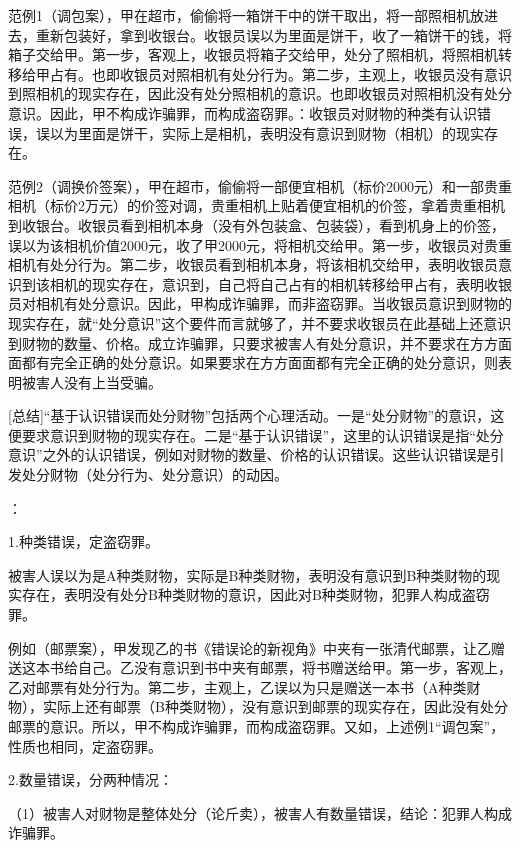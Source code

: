 范例1（调包案），甲在超市，偷偷将一箱饼干中的饼干取出，将一部照相机放进去，重新包装好，拿到收银台。收银员误以为里面是饼干，收了一箱饼干的钱，将箱子交给甲。第一步，客观上，收银员将箱子交给甲，处分了照相机，将照相机转移给甲占有。也即收银员对照相机有处分行为。第二步，主观上，收银员没有意识到照相机的现实存在，因此没有处分照相机的意识。也即收银员对照相机没有处分意识。因此，甲不构成诈骗罪，而构成盗窃罪。：收银员对财物的种类有认识错误，误以为里面是饼干，实际上是相机，表明没有意识到财物（相机）的现实存在。

范例2（调换价签案），甲在超市，偷偷将一部便宜相机（标价2000元）和一部贵重相机（标价2万元）的价签对调，贵重相机上贴着便宜相机的价签，拿着贵重相机到收银台。收银员看到相机本身（没有外包装盒、包装袋），看到机身上的价签，误以为该相机价值2000元，收了甲2000元，将相机交给甲。第一步，收银员对贵重相机有处分行为。第二步，收银员看到相机本身，将该相机交给甲，表明收银员意识到该相机的现实存在，意识到，自己将自己占有的相机转移给甲占有，表明收银员对相机有处分意识。因此，甲构成诈骗罪，而非盗窃罪。当收银员意识到财物的现实存在，就“处分意识”这个要件而言就够了，并不要求收银员在此基础上还意识到财物的数量、价格。成立诈骗罪，只要求被害人有处分意识，并不要求在方方面面都有完全正确的处分意识。如果要求在方方面面都有完全正确的处分意识，则表明被害人没有上当受骗。

[总结]“基于认识错误而处分财物”包括两个心理活动。一是“处分财物”的意识，这便要求意识到财物的现实存在。二是“基于认识错误”，这里的认识错误是指“处分意识”之外的认识错误，例如对财物的数量、价格的认识错误。这些认识错误是引发处分财物（处分行为、处分意识）的动因。

：

1.种类错误，定盗窃罪。

被害人误以为是A种类财物，实际是B种类财物，表明没有意识到B种类财物的现实存在，表明没有处分B种类财物的意识，因此对B种类财物，犯罪人构成盗窃罪。

例如（邮票案），甲发现乙的书《错误论的新视角》中夹有一张清代邮票，让乙赠送这本书给自己。乙没有意识到书中夹有邮票，将书赠送给甲。第一步，客观上，乙对邮票有处分行为。第二步，主观上，乙误以为只是赠送一本书（A种类财物），实际上还有邮票（B种类财物），没有意识到邮票的现实存在，因此没有处分邮票的意识。所以，甲不构成诈骗罪，而构成盗窃罪。又如，上述例1“调包案”，性质也相同，定盗窃罪。

2.数量错误，分两种情况：

（1）被害人对财物是整体处分（论斤卖），被害人有数量错误，结论：犯罪人构成诈骗罪。

